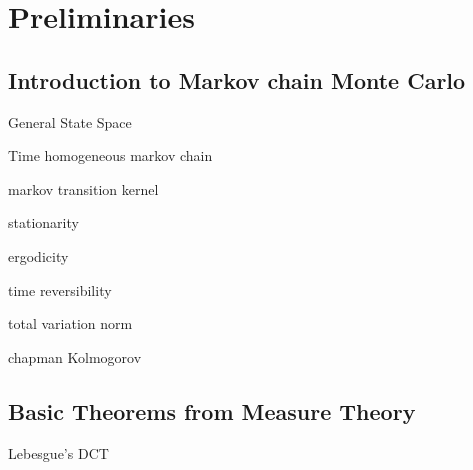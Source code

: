 \chapter{Preliminaries}
\section{Introduction to Markov chain Monte Carlo}
\begin{definition}
	General State Space
\end{definition}
\begin{definition}
	Time homogeneous markov chain
\end{definition}
\begin{definition}
	markov transition kernel
\end{definition}
\begin{definition}
	stationarity
\end{definition}
\begin{definition}
	ergodicity
\end{definition}
\begin{definition}
	time reversibility
\end{definition}
\begin{definition}
	total variation norm
\end{definition}
\begin{definition}
	chapman Kolmogorov
\end{definition}

\section{Basic Theorems from Measure Theory}
\begin{theorem}
	Lebesgue's DCT
\end{theorem}
